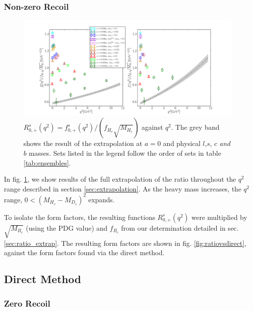 \subsubsection{Non-zero Recoil}

\begin{figure}[htb!]
  \hspace{-85pt}
  \includegraphics[width=1.40\textwidth]{images/BsDs/ratio/f0fpfHc_vsq2.pdf}
  \caption{ $R_{0,+}^s(q^2) = f_{0,+}^s(q^2)/(f_{H_c}\sqrt{M_{H_c}})$ against $q^2$. The grey band shows the result of the extrapolation at $a=0$ and physical $l$,$s$, $c$ {\it{and}} $b$ masses. Sets listed in the legend follow the order of sets in table \ref{tab:ensembles}. \label{fig:ratiodata}}
\end{figure}

In fig. \ref{fig:ratiodata}, we show results of the full extrapolation of the ratio throughout the $q^2$ range described in section \ref{sec:extrapolation}. As the heavy mass increases, the $q^2$ range, $0 < (M_{H_s}-M_{D_s})^2$ expands.

To isolate the form factors, the resulting functions $R_{0,+}^s(q^2)$ were multiplied by $\sqrt{M_{B_c}}$ (using the PDG value) and $f_{B_c}$ from our determination detailed in sec. \ref{sec:ratio_extrap}. The resulting form factors are shown in fig. \ref{fig:ratiovsdirect}, against the form factors found via the direct method.

\subsection{Direct Method}

\subsubsection{Zero Recoil}
\label{sec:directq2max}

